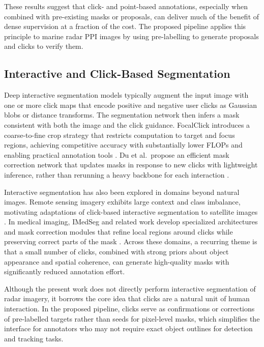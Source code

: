 \documentclass[twocolumn, 10pt]{article}
\begin{document}
These results suggest that click- and point-based annotations, especially when combined with pre-existing masks or proposals, can deliver much of the benefit of dense supervision at a fraction of the cost. The proposed pipeline applies this principle to marine radar PPI images by using pre-labelling to generate proposals and clicks to verify them.

\subsection{Interactive and Click-Based Segmentation}

Deep interactive segmentation models typically augment the input image with one or more click maps that encode positive and negative user clicks as Gaussian blobs or distance transforms. The segmentation network then infers a mask consistent with both the image and the click guidance. FocalClick introduces a coarse-to-fine crop strategy that restricts computation to target and focus regions, achieving competitive accuracy with substantially lower FLOPs and enabling practical annotation tools \cite{Chen2022FocalClick}. Du et al.\ propose an efficient mask correction network that updates masks in response to new clicks with lightweight inference, rather than rerunning a heavy backbone for each interaction \cite{Du2023EfficientMask}.

Interactive segmentation has also been explored in domains beyond natural images. Remote sensing imagery exhibits large context and class imbalance, motivating adaptations of click-based interactive segmentation to satellite images \cite{Chen2024RemoteSensingInteractive}. In medical imaging, IMedSeg and related work develop specialized architectures and mask correction modules that refine local regions around clicks while preserving correct parts of the mask \cite{Shi2025IMedSeg}. Across these domains, a recurring theme is that a small number of clicks, combined with strong priors about object appearance and spatial coherence, can generate high-quality masks with significantly reduced annotation effort.

Although the present work does not directly perform interactive segmentation of radar imagery, it borrows the core idea that clicks are a natural unit of human interaction. In the proposed pipeline, clicks serve as confirmations or corrections of pre-labelled targets rather than seeds for pixel-level masks, which simplifies the interface for annotators who may not require exact object outlines for detection and tracking tasks.
\end{document}
